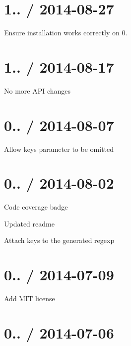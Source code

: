 \section*{1.. / 2014-\/08-\/27 }


\begin{DoxyItemize}
\item Ensure installation works correctly on 0.
\end{DoxyItemize}

\section*{1.. / 2014-\/08-\/17 }


\begin{DoxyItemize}
\item No more A\+PI changes
\end{DoxyItemize}

\section*{0.. / 2014-\/08-\/07 }


\begin{DoxyItemize}
\item Allow keys parameter to be omitted
\end{DoxyItemize}

\section*{0.. / 2014-\/08-\/02 }


\begin{DoxyItemize}
\item Code coverage badge
\item Updated readme
\item Attach keys to the generated regexp
\end{DoxyItemize}

\section*{0.. / 2014-\/07-\/09 }


\begin{DoxyItemize}
\item Add M\+IT license
\end{DoxyItemize}

\section*{0.. / 2014-\/07-\/06 }


